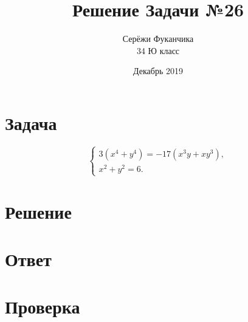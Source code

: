 \documentclass{article}
\title{Решение Задачи №26}
\author{Серёжи Фуканчика\\34 Ю класс}
\date{Декабрь 2019}
\begin{document}
\maketitle

\section{Задача}
\begin{equation}
\begin{cases}
3(x^4+y^4)=-17(x^3y+xy^3),\\x^2+y^2=6.
\end{cases}
\end{equation}

\section{Решение}

\section{Ответ}

\section{Проверка}
\end{document}
